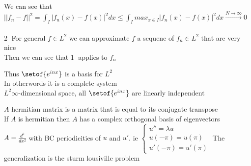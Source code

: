 \documentclass[answers,12pt,addpoints]{exam}
\begin{document}
\begin{theorem}
\begin{remark}
        We can see that $||f_n - f||^2 = \int_{I} |f_n(x) - f(x)|^2 dx \leq \int_{I} max_{x \in I} |f_n(x) - f(x)|^2 dx \xrightarrow{N \to \infty} 0 $\\\\
        \textcircled{2} For general $f \in L^2$ we can approximate $f$ a sequene of $f_n \in L^2$ that are very nice\\
        Then we can see that \textcircled{1} applies to $f_n$
    \end{remark}
    Thus $\setof{e^{inx}}$ is a basis for $L^2$\\
    In otherwords it is a complete system\\
    $L^2 \infty$-dimensional space, all $\setof{e^{inx}}$ are linearly independent\\
    \begin{remark}
        $A$ hermitian matrix is a matrix that is equal to its conjugate transpose\\
        If $A$ is hermitian then $A$ has a complex orthogonal basis of eigenvectors\\
        $A = \frac{d^2}{dx^2} $ with BC periodicities of $u$ and $u'$. ie $\begin{cases}
            u'' = \lambda u\\
            u(-\pi) = u(\pi)\\
            u'(-\pi) = u'(\pi)
        \end{cases}$
        The generalization is the sturm lousiville problem
    \end{remark}
    
    

\end{theorem}
\end{document}
